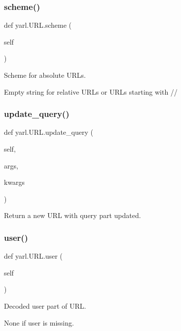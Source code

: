 \subsubsection{\texorpdfstring{scheme()}{scheme()}}
{\footnotesize\ttfamily def yarl.\+U\+R\+L.\+scheme (\begin{DoxyParamCaption}\item[{}]{self }\end{DoxyParamCaption})}

\begin{DoxyVerb}Scheme for absolute URLs.

Empty string for relative URLs or URLs starting with //\end{DoxyVerb}
 \mbox{\label{classyarl_1_1_u_r_l_a6d444b93736628dcb4c168b0a2f673d9}} 
\subsubsection{\texorpdfstring{update\+\_\+query()}{update\_query()}}
{\footnotesize\ttfamily def yarl.\+U\+R\+L.\+update\+\_\+query (\begin{DoxyParamCaption}\item[{}]{self,  }\item[{}]{args,  }\item[{}]{kwargs }\end{DoxyParamCaption})}

\begin{DoxyVerb}Return a new URL with query part updated.\end{DoxyVerb}
 \mbox{\label{classyarl_1_1_u_r_l_ab04fc87f41bbf84de1c3af564afa6e2f}} 
\subsubsection{\texorpdfstring{user()}{user()}}
{\footnotesize\ttfamily def yarl.\+U\+R\+L.\+user (\begin{DoxyParamCaption}\item[{}]{self }\end{DoxyParamCaption})}

\begin{DoxyVerb}Decoded user part of URL.

None if user is missing.\end{DoxyVerb}
 \mbox{\label{classyarl_1_1_u_r_l_a846e1ebcc72be24c20889429d6865f15}} 
